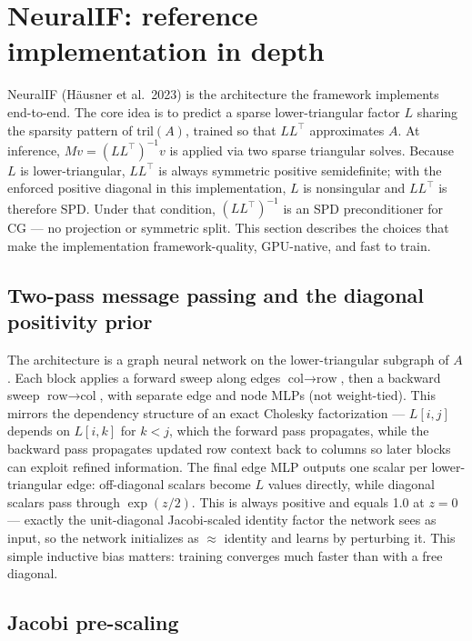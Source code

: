 \documentclass[11pt]{article}
\begin{document}
\section{NeuralIF: reference implementation in depth}

NeuralIF (H\"ausner et al.\ 2023) is the architecture the framework implements end-to-end. The core idea is to predict a sparse lower-triangular factor $L$ sharing the sparsity pattern of $\mathrm{tril}(A)$, trained so that $LL^\top$ approximates $A$. At inference, $Mv = (LL^\top)^{-1}v$ is applied via two sparse triangular solves. Because $L$ is lower-triangular, $LL^\top$ is always symmetric positive semidefinite; with the enforced positive diagonal in this implementation, $L$ is nonsingular and $LL^\top$ is therefore SPD. Under that condition, $(LL^\top)^{-1}$ is an SPD preconditioner for CG --- no projection or symmetric split. This section describes the choices that make the implementation framework-quality, GPU-native, and fast to train.

\subsection{Two-pass message passing and the diagonal positivity prior}

The architecture is a graph neural network on the lower-triangular subgraph of $A$. Each block applies a forward sweep along edges $\text{col} \to \text{row}$, then a backward sweep $\text{row} \to \text{col}$, with separate edge and node MLPs (not weight-tied). This mirrors the dependency structure of an exact Cholesky factorization --- $L[i,j]$ depends on $L[i,k]$ for $k<j$, which the forward pass propagates, while the backward pass propagates updated row context back to columns so later blocks can exploit refined information. The final edge MLP outputs one scalar per lower-triangular edge: off-diagonal scalars become $L$ values directly, while diagonal scalars pass through $\exp(z/2)$. This is always positive and equals 1.0 at $z=0$ --- exactly the unit-diagonal Jacobi-scaled identity factor the network sees as input, so the network initializes as $\approx$ identity and learns by perturbing it. This simple inductive bias matters: training converges much faster than with a free diagonal.

\subsection{Jacobi pre-scaling}
\end{document}
